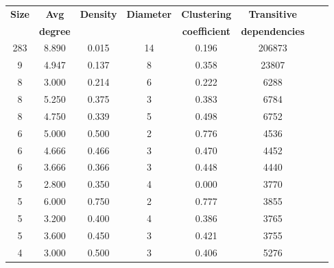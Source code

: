 \begin{table}
    \begin{tabular}{|c|c|c|c|c|c|c|c|}
        \hline
        \textbf{Size} & \textbf{Avg}    & \textbf{Density} & \textbf{Diameter} & \textbf{Clustering}  & \textbf{Transitive}   \\
                      & \textbf{degree} &                  &                   & \textbf{coefficient} & \textbf{dependencies} \\
        \hline
        283           & 8.890           & 0.015            & 14                & 0.196                & 206873                \\
        9             & 4.947           & 0.137            & 8                 & 0.358                & 23807                 \\
        8             & 3.000           & 0.214            & 6                 & 0.222                & 6288                  \\
        8             & 5.250           & 0.375            & 3                 & 0.383                & 6784                  \\
        8             & 4.750           & 0.339            & 5                 & 0.498                & 6752                  \\
        6             & 5.000           & 0.500            & 2                 & 0.776                & 4536                  \\
        6             & 4.666           & 0.466            & 3                 & 0.470                & 4452                  \\
        6             & 3.666           & 0.366            & 3                 & 0.448                & 4440                  \\
        5             & 2.800           & 0.350            & 4                 & 0.000                & 3770                  \\
        5             & 6.000           & 0.750            & 2                 & 0.777                & 3855                  \\
        5             & 3.200           & 0.400            & 4                 & 0.386                & 3765                  \\
        5             & 3.600           & 0.450            & 3                 & 0.421                & 3755                  \\
        4             & 3.000           & 0.500            & 3                 & 0.406                & 5276                  \\

\end{tabular}
\end{table}
